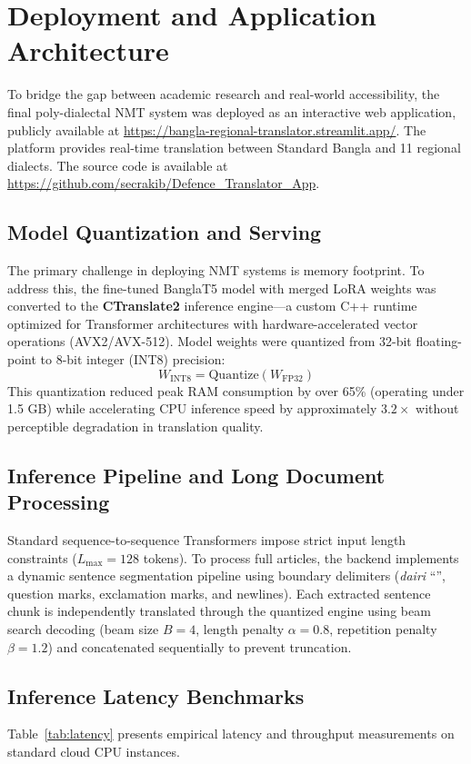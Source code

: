 \documentclass[12pt,a4paper]{article}
\begin{document}
\section{Deployment and Application Architecture}

To bridge the gap between academic research and real-world accessibility, the final poly-dialectal NMT system was deployed as an interactive web application, publicly available at \url{https://bangla-regional-translator.streamlit.app/}. The platform provides real-time translation between Standard Bangla and 11 regional dialects. The source code is available at \url{https://github.com/secrakib/Defence_Translator_App}.

\subsection{Model Quantization and Serving}
The primary challenge in deploying NMT systems is memory footprint. To address this, the fine-tuned BanglaT5 model with merged LoRA weights was converted to the \textbf{CTranslate2} inference engine---a custom C++ runtime optimized for Transformer architectures with hardware-accelerated vector operations (AVX2/AVX-512). Model weights were quantized from 32-bit floating-point to 8-bit integer (INT8) precision:
\begin{equation}
W_{\text{INT8}} = \text{Quantize}(W_{\text{FP32}})
\end{equation}
This quantization reduced peak RAM consumption by over 65\% (operating under 1.5 GB) while accelerating CPU inference speed by approximately $3.2\times$ without perceptible degradation in translation quality.

\subsection{Inference Pipeline and Long Document Processing}
Standard sequence-to-sequence Transformers impose strict input length constraints ($L_{\max} = 128$ tokens). To process full articles, the backend implements a dynamic sentence segmentation pipeline using boundary delimiters (\textit{dairi} ``\textbar'', question marks, exclamation marks, and newlines). Each extracted sentence chunk is independently translated through the quantized engine using beam search decoding (beam size $B = 4$, length penalty $\alpha = 0.8$, repetition penalty $\beta = 1.2$) and concatenated sequentially to prevent truncation.

\subsection{Inference Latency Benchmarks}
Table~\ref{tab:latency} presents empirical latency and throughput measurements on standard cloud CPU instances.
\end{document}
